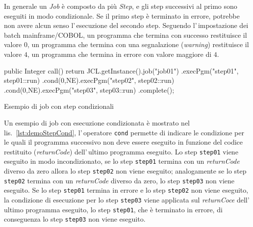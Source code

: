 In generale un \textit{Job} è composto da più \textit{Step}, e gli step
successivi al primo sono eseguiti in modo condizionale.
Se il primo step è terminato in errore, potrebbe non avere alcun senso
l'\,esecuzione del secondo step.
Seguendo l'\,impostazione dei batch mainframe/COBOL, un programma che termina
con successo restituisce il valore $0$, un programma che termina con una
segnalazione (\textit{warning}) restituisce il valore $4$, un programma che
termina in errore con valore maggiore di $4$.


\begin{elisting}[!htb]
    \begin{javacode}
        public Integer call() {
    return JCL.getInstance().job("job01")
        .execPgm("step01", step01::run)
        .cond(0,NE).execPgm("step02", step02::run)
        .cond(0,NE).execPgm("step03", step03::run)
        .complete();
}
    \end{javacode}
    \caption{Esempio di job con step condizionali}
    \label{lst:demoStepCond}
\end{elisting}
Un esempio di job con esecuzione condizionata è mostrato nel
lis.~\ref{lst:demoStepCond}, l'\,operatore \texttt{cond} permette di indicare
le condizione per le quali il programma successivo non deve essere eseguito in
funzione del codice restituito (\textit{returnCode}) dell'\,ultimo programma
eseguito.
Lo step \texttt{step01} viene eseguito in modo incondizionato, se lo step
\texttt{step01} termina con un \textit{returnCode} diverso da zero allora lo
step \texttt{step02} non viene eseguito; analogamente se lo step \texttt{step02}
termina con un \textit{returnCode} diverso da zero, lo step \texttt{step03} non
viene eseguito.
Se lo step \texttt{step01} termina in errore e lo step \texttt{step02} non viene
eseguito, la condizione di esecuzione per lo step \texttt{step03} viene
applicata sul \textit{returnCoce} dell'\,ultimo programma eseguito, lo step
\texttt{step01}, che è terminato in errore, di conseguenza lo step
\texttt{step03} non viene eseguito.

